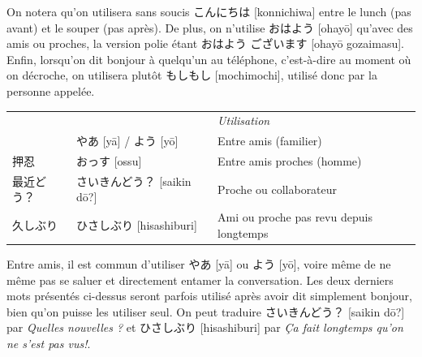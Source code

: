 \documentclass[a4paper,11pt,final]{article}
\newcommand{\sectit}[1]{\bigskip\hspace{-5mm}{\color{sectionblue}$\blacksquare$~~\Large\bfseries #1}}
\newcommand{\romaji}[1]{{\footnotesize[#1]}}
\begin{document}
On notera qu'on utilisera sans soucis こんにちは \romaji{konnichiwa} entre le lunch (pas avant) et le souper (pas après). De plus, on n'utilise おはよう \romaji{ohay\=o} qu'avec des amis ou proches, la version polie étant おはよう ございます \romaji{ohay\=o gozaimasu}. Enfin, lorsqu'on dit bonjour à quelqu'un au téléphone, c'est-à-dire au moment où on décroche, on utilisera plutôt もしもし \romaji{mochimochi}, utilisé donc par la personne appelée.

\begin{center}
\end{center}


\sectit{Discours informel}

\hspace{5mm}\begin{tabular}{|p{2cm}p{4.5cm}l}
	\multicolumn{1}{l}{}&& \it\small Utilisation \\
					& やあ \romaji{y\=a} / よう \romaji{y\=o}	& Entre amis (familier) \\
	押忍				& おっす \romaji{ossu}					& Entre amis proches (homme) \\
	最近どう？		& さいきんどう？ \romaji{saikin d\=o?}		& Proche ou collaborateur \\
	久しぶり			& ひさしぶり \romaji{hisashiburi}			& Ami ou proche pas revu depuis longtemps
\end{tabular}

Entre amis, il est commun d'utiliser やあ \romaji{y\=a} ou よう \romaji{y\=o}, voire même de ne même pas se saluer et directement entamer la conversation. Les deux derniers mots présentés ci-dessus seront parfois utilisé après avoir dit simplement bonjour, bien qu'on puisse les utiliser seul. On peut traduire さいきんどう？ \romaji{saikin d\=o?} par \og\textit{Quelles nouvelles ?}\fg{} et ひさしぶり \romaji{hisashiburi} par \og\textit{Ça fait longtemps qu'on ne s'est pas vus!}\fg.
\end{document}
